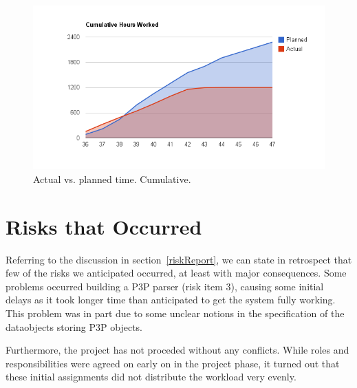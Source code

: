 \begin{centering}
  \begin{figure}
    \includegraphics[width = \textwidth]{Evaluation/actual_v_planned_cuml.png}
    \caption{Actual vs. planned time. Cumulative.}
    \label{actualPlannedCuml}
  \end{figure}
\end{centering}

\section{Risks that Occurred}

Referring to the discussion in section~\ref{riskReport}, we can state
in retrospect that few of the risks we anticipated occurred, at least
with major consequences. Some problems occurred building a P3P
parser (risk item 3), causing some initial delays as it took longer time than
anticipated to get the system fully working. This problem was in part
due to some unclear notions in the specification of the dataobjects
storing P3P objects.

Furthermore, the project has not proceded without any conflicts. While
roles and responsibilities were agreed on early on in the project
phase, it turned out that these initial assignments did not distribute the
workload very evenly. 
